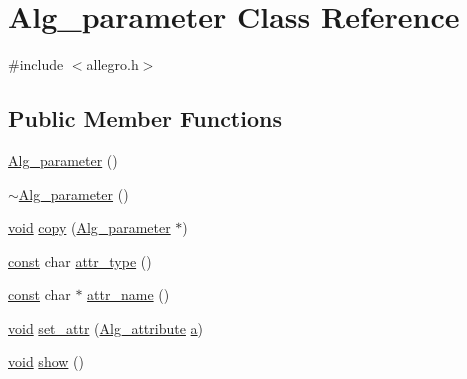 \hypertarget{class_alg__parameter}{}\section{Alg\+\_\+parameter Class Reference}
\label{class_alg__parameter}


{\ttfamily \#include $<$allegro.\+h$>$}

\subsection*{Public Member Functions}
\begin{DoxyCompactItemize}
\item 
\hyperlink{class_alg__parameter_a2ca4ead7cc90346aff1d11f14920ecf7}{Alg\+\_\+parameter} ()
\item 
\hyperlink{class_alg__parameter_a1db4e6f687c25c59065ec1cf132f9375}{$\sim$\+Alg\+\_\+parameter} ()
\item 
\hyperlink{sound_8c_ae35f5844602719cf66324f4de2a658b3}{void} \hyperlink{class_alg__parameter_ae53e53a67884d2f82e4b62c315baf8b9}{copy} (\hyperlink{class_alg__parameter}{Alg\+\_\+parameter} $\ast$)
\item 
\hyperlink{getopt1_8c_a2c212835823e3c54a8ab6d95c652660e}{const} char \hyperlink{class_alg__parameter_a9a93db2cd787c2f33534ae7f7aa770ee}{attr\+\_\+type} ()
\item 
\hyperlink{getopt1_8c_a2c212835823e3c54a8ab6d95c652660e}{const} char $\ast$ \hyperlink{class_alg__parameter_ad3150fc4bf7688ed1d3d11193e0550c0}{attr\+\_\+name} ()
\item 
\hyperlink{sound_8c_ae35f5844602719cf66324f4de2a658b3}{void} \hyperlink{class_alg__parameter_a44e3044fdee35a21b6b961b8b773575c}{set\+\_\+attr} (\hyperlink{allegro_8h_a45c52ae87418a599d8196abd30aea3bd}{Alg\+\_\+attribute} \hyperlink{class_alg__parameter_a0299bf397a425aedd5d302d35b4f02f5}{a})
\item 
\hyperlink{sound_8c_ae35f5844602719cf66324f4de2a658b3}{void} \hyperlink{class_alg__parameter_a1696396b26e2afecbed2d114743565b8}{show} ()
\end{DoxyCompactItemize}
